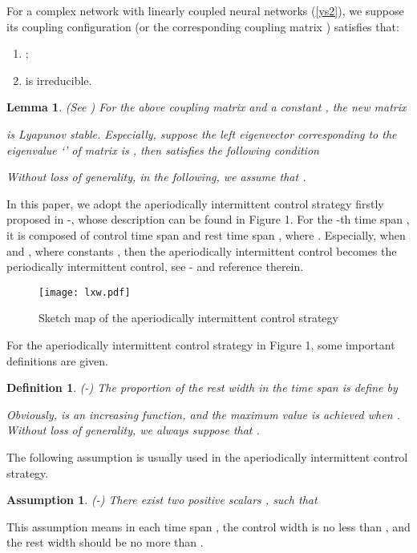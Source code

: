 \documentclass[review]{elsarticle}
\newtheorem{lem}{Lemma}
\newtheorem{mydef}{Definition}
\newtheorem{asu}{Assumption}
\begin{document}
For a complex network with  linearly coupled neural networks (\ref{ys2}), we suppose its coupling configuration (or the corresponding coupling matrix ) satisfies that:
\begin{enumerate}
  \item ;
  \item  is irreducible.
\end{enumerate}

\begin{lem}\label{lyasta}
(See \cite{CLL07}) For the above  coupling matrix  and a constant , the new matrix

is Lyapunov stable. Especially, suppose the left eigenvector corresponding to the eigenvalue `' of matrix  is , then  satisfies the following condition

Without loss of generality, in the following, we assume that .
\end{lem}

In this paper, we adopt the aperiodically intermittent control strategy firstly proposed in \cite{LC2015}-\cite{LLC15}, whose description can be found in Figure 1. For the -th time span , it is composed of control time span  and rest time span , where . Especially, when  and , where constants , then the aperiodically intermittent control becomes the periodically intermittent control, see \cite{HYJT2012}-\cite{LiuC11} and reference therein.

\begin{figure}
\begin{center}
\texttt{[image: lxw.pdf]}
\end{center}
\label{sk}
\caption{Sketch map of the aperiodically intermittent control strategy}
\end{figure}

For the aperiodically intermittent control strategy in Figure 1, some important definitions are given.
\begin{mydef}\label{rho}
(\cite{LC2015}-\cite{LLC15}) The proportion of the rest width  in the time span  is define by

Obviously,  is an increasing function, and the maximum value is achieved when . Without loss of generality, we always suppose that .
\end{mydef}

The following assumption is usually used in the aperiodically intermittent control strategy.
\begin{asu}\label{asutime}
(\cite{LC2015}-\cite{LLC15}) There exist two positive scalars , such that

\end{asu}
This assumption means in each time span , the control width is no less than , and the rest width should be no more than .
\end{document}
